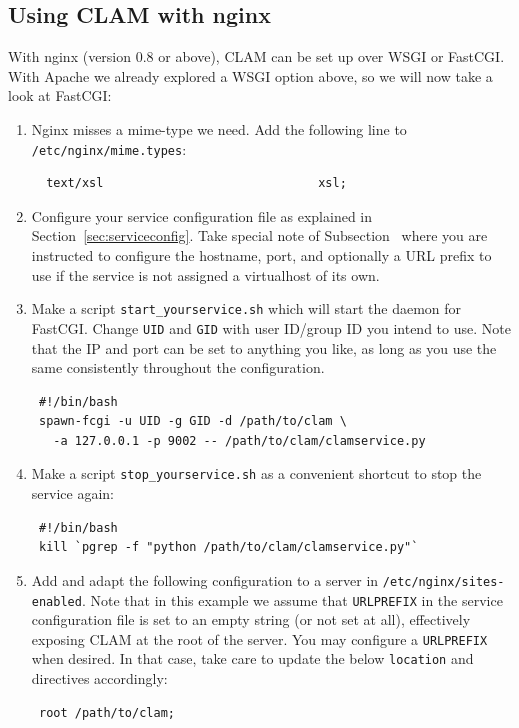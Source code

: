 \documentclass[a4paper,12pt]{report}
\begin{document}
\subsection{Using CLAM with nginx}

With nginx (version 0.8 or above), CLAM can be set up over WSGI or FastCGI.
With Apache we already explored a WSGI option above, so we will now take a look
at FastCGI:

\begin{enumerate} \item Nginx misses a mime-type we need. Add the following
    line to \texttt{/etc/nginx/mime.types}:
\begin{verbatim}
  text/xsl                              xsl;
\end{verbatim}

\item Configure your service configuration file as explained in Section~\ref{sec:serviceconfig}. Take special note of Subsection~\label{sec:sadmin} where you are instructed to configure the hostname, port, and optionally a URL prefix to use if the service is not assigned a virtualhost of its own.

\item Make a script \texttt{start\_yourservice.sh} which will start the daemon for FastCGI. Change \texttt{UID} and \texttt{GID} with user ID/group ID you intend to use. Note that the IP and port can be set to anything you like, as long as you use the same consistently throughout the configuration.
\begin{verbatim}
 #!/bin/bash
 spawn-fcgi -u UID -g GID -d /path/to/clam \
   -a 127.0.0.1 -p 9002 -- /path/to/clam/clamservice.py
\end{verbatim}

\item Make a script \texttt{stop\_yourservice.sh} as a convenient shortcut to stop the service again:
\begin{verbatim}
 #!/bin/bash
 kill `pgrep -f "python /path/to/clam/clamservice.py"`
\end{verbatim}

\item Add and adapt the following configuration to a server in \texttt{/etc/nginx/sites-enabled}. Note that in this example we assume that \texttt{URLPREFIX} in the service configuration file is set to an empty string (or not set at all), effectively exposing CLAM at the root of the server. You may configure a \texttt{URLPREFIX} when desired. In that case, take care to update the below \texttt{location} and directives accordingly:
\begin{verbatim}
 root /path/to/clam;


\end{verbatim}
\end{enumerate}
\end{document}
